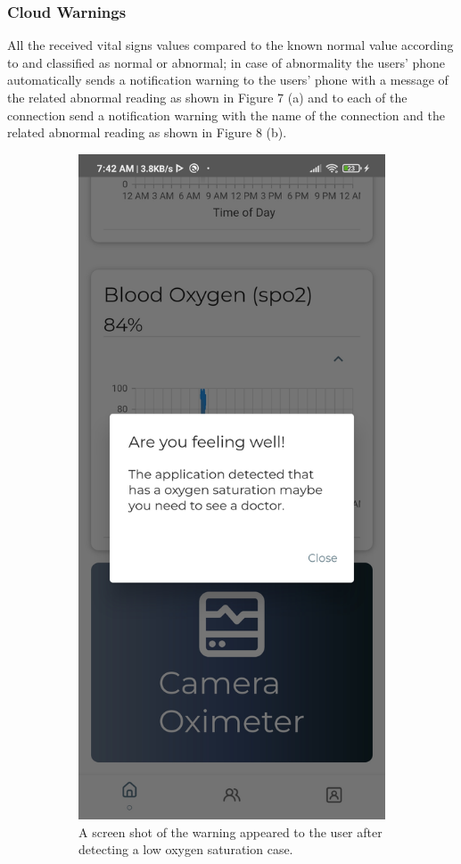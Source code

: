 \documentclass{bmcart}
\begin{document}
\subsubsection*{Cloud Warnings}
All the received vital signs values compared to the known normal value according
to \cite{pulse} and classified as normal or abnormal; in case of abnormality the
users' phone automatically sends a notification warning to the users' phone with
a message of the related abnormal reading as shown in Figure 7 (a) and to each of
the connection send a notification warning with the name of the connection and
the related abnormal reading as shown in Figure 8 (b).
\begin{figure}[h!]
  \begin{subfigure}{0.45\textwidth}
  \includegraphics[width=.5\linewidth]{jpg_images/user_warning.jpg}
  \caption{
      A screen shot of the warning appeared to the user after detecting a low
      oxygen saturation case.}
    \end{subfigure}
    \begin{subfigure}{0.45\textwidth}

\end{subfigure}
\end{figure}
\end{document}
